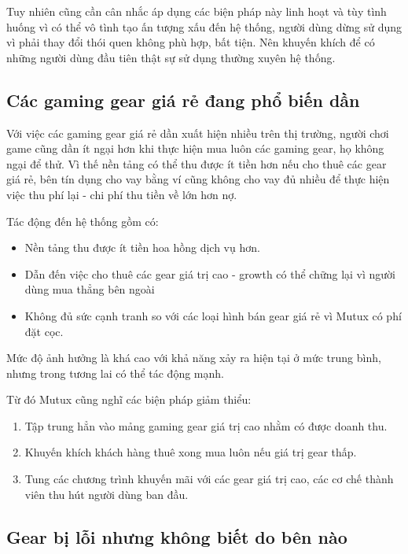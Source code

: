Tuy nhiên cũng cần cân nhắc áp dụng các biện pháp này linh hoạt và tùy tình huống vì có thể vô tình tạo ấn tượng xấu đến hệ thống, người dùng dừng sử dụng vì phải thay đổi thói quen không phù hợp, bất tiện. Nên khuyến khích để có những người dùng đầu tiên thật sự sử dụng thường xuyên hệ thống.

\subsection{Các gaming gear giá rẻ đang phổ biến dần}

Với việc các gaming gear giá rẻ dần xuất hiện nhiều trên thị trường, người chơi game cũng dần ít ngại hơn khi thực hiện mua luôn các gaming gear, họ không ngại để thử. Vì thế nền tảng có thể thu được ít tiền hơn nếu cho thuê các gear giá rẻ, bên tín dụng cho vay bằng ví cũng không cho vay đủ nhiều để thực hiện việc thu phí lại - chi phí thu tiền về lớn hơn nợ.


Tác động đến hệ thống gồm có:
\begin{itemize}
    \item Nền tảng thu được ít tiền hoa hồng dịch vụ hơn.
    \item Dẫn đến việc cho thuê các gear giá trị cao - growth có thể chững lại vì người dùng mua thẳng bên ngoài
    \item Không đủ sức cạnh tranh so với các loại hình bán gear giá rẻ vì Mutux có phí đặt cọc.
\end{itemize}

Mức độ ảnh hưởng là khá cao với khả năng xảy ra hiện tại ở mức trung bình, nhưng trong tương lai có thể tác động mạnh.

Từ đó Mutux cũng nghĩ các biện pháp giảm thiểu: 

\begin{enumerate}
    \item Tập trung hẳn vào mảng gaming gear giá trị cao nhằm có được doanh thu.
    \item Khuyến khích khách hàng thuê xong mua luôn nếu giá trị gear thấp.
    \item Tung các chương trình khuyến mãi với các gear giá trị cao, các cơ chế thành viên thu hút người dùng ban đầu.
\end{enumerate}

\subsection{Gear bị lỗi nhưng không biết do bên nào}

